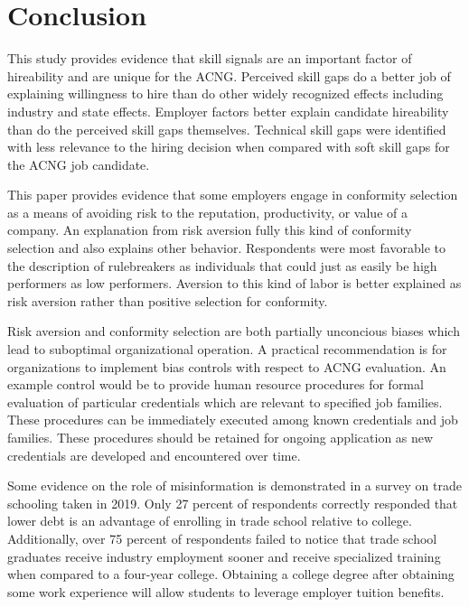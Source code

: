 \documentclass[review]{elsarticle}
\begin{document}
\section{Conclusion}

This study provides evidence that skill signals are an important factor of hireability and are unique for the ACNG.
Perceived skill gaps do a better job of explaining willingness to hire than do other widely recognized effects including industry and state effects.
Employer factors better explain candidate hireability than do the perceived skill gaps themselves.
Technical skill gaps were identified with less relevance to the hiring decision when compared with soft skill gaps for the ACNG job candidate.

This paper provides evidence that some employers engage in conformity selection as a means of avoiding risk to the reputation, productivity, or value of a company.
An explanation from risk aversion fully this kind of conformity selection and also explains other behavior.
Respondents were most favorable to the description of rulebreakers as individuals that could just as easily be high performers as low performers.
Aversion to this kind of labor is better explained as risk aversion rather than positive selection for conformity.

Risk aversion and conformity selection are both partially unconcious biases which lead to suboptimal organizational operation.
A practical recommendation is for organizations to implement bias controls with respect to ACNG evaluation.
An example control would be to provide human resource procedures for formal evaluation of particular credentials which are relevant to specified job families.
These procedures can be immediately executed among known credentials and job families.
These procedures should be retained for ongoing application as new credentials are developed and encountered over time.

Some evidence on the role of misinformation is demonstrated in a survey on trade schooling taken in 2019\cite{arabia_2019}.
Only 27 percent of respondents correctly responded that lower debt is an advantage of enrolling in trade school relative to college.
Additionally, over 75 percent of respondents failed to notice that trade school graduates receive industry employment sooner
and receive specialized training when compared to a four-year college.
Obtaining a college degree after obtaining some work experience will allow students to leverage employer tuition benefits.
\end{document}
